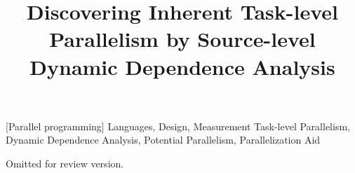 \documentclass[preprint,natbib]{sigplanconf}
\begin{document}
\title{Discovering Inherent Task-level Parallelism by Source-level Dynamic Dependence Analysis}

          
\maketitle 



[Parallel programming]
\terms
Languages, Design, Measurement
\keywords
Task-level Parallelism, Dynamic Dependence Analysis, Potential Parallelism, Parallelization Aid








\acks

Omitted for review version.



{}
\end{document}
